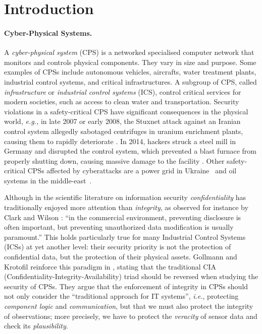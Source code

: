 \section{Introduction}
{%
\paragraph{Cyber-Physical Systems.} A \emph{cyber-physical system} (CPS) is a networked specialised computer network that monitors and controls physical components. They vary in size and purpose. 
Some examples of CPSs include autonomous vehicles, aircrafts, water treatment plants, industrial control systems, and critical infrastructures. 
A subgroup of CPS, called \emph{infrastructure} or \emph{industrial control systems} (ICS), control critical services for modern societies, such as access to clean water and transportation.
Security violations in a safety-critical CPS have significant consequences in the physical world, \emph{e.g.,} in late 2007 or early 2008, the Stuxnet attack against an Iranian control system allegedly sabotaged centrifuges in uranium enrichment plants, causing them to rapidly deteriorate \cite{StuxnetWeb,Stuxnet}.
In 2014, hackers struck a steel mill in Germany and disrupted the control system, which prevented a blast furnace from properly shutting down, causing massive damage to the facility \cite{WiredArticle,Lagebericht2014}.
Other safety-critical CPSs affected by cyberattacks are a power grid in Ukraine~\cite{cherepanov2017industroyer} and oil systems in the middle-east~\cite{johnson2018attackers}.
}
{

Although in the scientific literature on information security \emph{confidentiality} has traditionally enjoyed more attention than \emph{integrity}, as observed for instance by Clark and Wilson \cite{ClarkWilson87}: ``in the commercial environment, preventing disclosure is often important, but preventing unauthorized data modification is usually paramount.''
This holds particularly true for many Industrial Control Systems (ICSs) at yet another level: their security priority is not the protection of confidential data, but the protection of their physical assets.  Gollmann and Krotofil reinforce this paradigm in \cite{CPSSec}, stating that the traditional CIA (Confidentiality-Integrity-Availability) triad should be reversed when studying the security of CPSs. They argue that the enforcement of integrity in CPSs should not only consider the ``traditional approach for IT systems'', \emph{i.e.}, protecting \emph{component logic} and \emph{communication}, but that we must also protect the integrity of {observations}; more precisely, we have to protect the \emph{veracity} of sensor data and check its \emph{plausibility}.}

